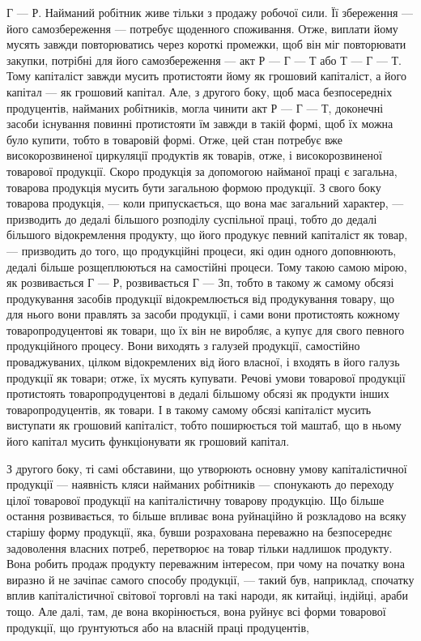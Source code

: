 Г — Р. Найманий робітник живе тільки з продажу робочої сили. Її збереження — його самозбереження —
потребує щоденного споживання. Отже, виплати йому мусять завжди повторюватись через короткі
промежки, щоб він міг повторювати закупки, потрібні для його самозбереження — акт Р — Г — Т або Т —
Г — Т. Тому капіталіст завжди мусить протистояти йому як грошовий капіталіст, а його капітал — як
грошовий капітал. Але, з другого боку, щоб маса безпосередніх продуцентів, найманих
робітників, могла чинити акт Р — Г — Т, доконечні засоби існування повинні протистояти їм завжди в
такій формі, щоб їх можна було купити, тобто в товаровій формі. Отже, цей стан потребує вже
високорозвиненої циркуляції продуктів як товарів, отже, і високорозвиненої товарової продукції.
Скоро продукція за допомогою найманої праці є загальна, товарова продукція мусить бути загальною
формою продукції.
З свого боку товарова продукція, — коли припускається, що вона має загальний характер, — призводить
до дедалі більшого розподілу суспільної праці, тобто до дедалі більшого відокремлення продукту, що
його продукує певний капіталіст як товар, — призводить до того, що продукційні процеси, які один
одного доповнюють, дедалі більше розщеплюються на самостійні процеси. Тому такою самою мірою, як
розвивається Г — Р, розвивається Г — Зп, тобто в такому ж самому обсязі продукування засобів
продукції відокремлюється від продукування товару, що для нього вони правлять за засоби продукції, і
сами вони протистоять кожному товаропродуцентові як товари, що їх він не виробляє, а купує для свого
певного продукційного процесу. Вони
виходять з галузей продукції, самостійно проваджуваних, цілком відокремлених
від його власної, і входять в його галузь продукції як товари; отже, їх мусять купувати. Речові
умови товарової продукції протистоять товаропродуцентові в дедалі більшому обсязі як продукти інших
товаропродуцентів, як товари. І в такому самому обсязі капіталіст мусить виступати як грошовий
капіталіст, тобто поширюється той маштаб, що в ньому його капітал мусить функціонувати як грошовий
капітал.

З другого боку, ті самі обставини, що утворюють основну умову капіталістичної продукції — наявність
кляси найманих робітників — спонукають до переходу цілої товарової продукції на капіталістичну
товарову продукцію. Що більше остання розвивається, то більше впливає вона руйнаційно й розкладово
на всяку старішу форму продукції, яка, бувши розрахована переважно на безпосереднє задоволення
власних потреб, перетворює на товар тільки надлишок продукту. Вона робить продаж продукту
переважним інтересом, при чому на початку вона виразно й не зачіпає самого способу продукції, —
такий був, наприклад, спочатку вплив капіталістичної світової торговлі на такі народи, як китайці,
індійці, араби тощо. Але далі, там, де вона вкорінюється, вона руйнує всі форми товарової продукції,
що ґрунтуються або на власній праці продуцентів,
\parbreak{}  %
